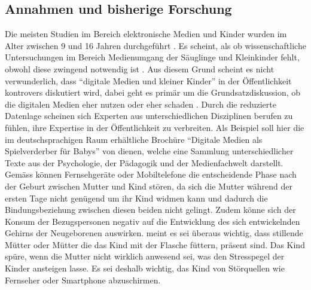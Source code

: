 \subsection{Annahmen und bisherige Forschung}
Die meisten Studien im Bereich elektronische Medien und Kinder wurden im Alter zwischen 9 und 16 Jahren durchgeführt \cite{Chaudron2015}. Es scheint, als ob wissenschaftliche Untersuchungen im Bereich Medienumgang der Säuglinge und Kleinkinder fehlt, obwohl diese zwingend notwendig ist \cite{Olafsson2014, Konitzer2017}. Aus diesem Grund scheint es nicht verwunderlich, dass \enquote{digitale Medien und kleiner Kinder} in der Öffentlichkeit kontrovers diskutiert wird, dabei geht es primär um die Grundsatzdiskussion, ob die digitalen Medien eher nutzen oder eher schaden \cite{Divsi2015}. Durch die reduzierte Datenlage scheinen sich Experten aus unterschiedlichen Disziplinen berufen zu fühlen, ihre Expertise in der Öffentlichkeit zu verbreiten. Als Beispiel soll hier die im deutschsprachigen Raum erhältliche Brochüre \enquote{Digitale Medien als Spielverderber für Babys} von  dienen, welche eine Sammlung unterschiedlicher Texte aus der Psychologie, der Pädagogik und der Medienfachwelt darstellt. Gemäss  können Fernsehgeräte oder Mobiltelefone die entscheidende Phase nach der Geburt zwischen Mutter und Kind stören, da sich die Mutter während der ersten Tage nicht genügend um ihr Kind widmen kann und dadurch die Bindungsbeziehung zwischen diesen beiden nicht gelingt. Zudem könne sich der Konsum der Bezugspersonen negativ auf die Entwicklung des sich entwickelnden Gehirns der Neugeborenen auswirken.  meint es sei überaus wichtig, dass stillende Mütter oder Mütter die das Kind mit der Flasche füttern, präsent sind. Das Kind spüre, wenn die Mutter nicht wirklich anwesend sei, was den Stresspegel der Kinder ansteigen lasse. Es sei deshalb wichtig, das Kind von Störquellen wie Fernseher oder Smartphone abzuschirmen. 

